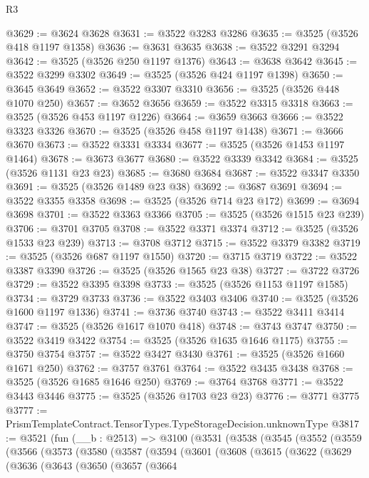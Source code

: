 \begin{lexlean}{R3}
\begin{coremodule}
@3629 := @3624 @3628
@3631 := @3522 @3283 @3286
@3635 := @3525 (@3526 @418 @1197 @1358)
@3636 := @3631 @3635
@3638 := @3522 @3291 @3294
@3642 := @3525 (@3526 @250 @1197 @1376)
@3643 := @3638 @3642
@3645 := @3522 @3299 @3302
@3649 := @3525 (@3526 @424 @1197 @1398)
@3650 := @3645 @3649
@3652 := @3522 @3307 @3310
@3656 := @3525 (@3526 @448 @1070 @250)
@3657 := @3652 @3656
@3659 := @3522 @3315 @3318
@3663 := @3525 (@3526 @453 @1197 @1226)
@3664 := @3659 @3663
@3666 := @3522 @3323 @3326
@3670 := @3525 (@3526 @458 @1197 @1438)
@3671 := @3666 @3670
@3673 := @3522 @3331 @3334
@3677 := @3525 (@3526 @1453 @1197 @1464)
@3678 := @3673 @3677
@3680 := @3522 @3339 @3342
@3684 := @3525 (@3526 @1131 @23 @23)
@3685 := @3680 @3684
@3687 := @3522 @3347 @3350
@3691 := @3525 (@3526 @1489 @23 @38)
@3692 := @3687 @3691
@3694 := @3522 @3355 @3358
@3698 := @3525 (@3526 @714 @23 @172)
@3699 := @3694 @3698
@3701 := @3522 @3363 @3366
@3705 := @3525 (@3526 @1515 @23 @239)
@3706 := @3701 @3705
@3708 := @3522 @3371 @3374
@3712 := @3525 (@3526 @1533 @23 @239)
@3713 := @3708 @3712
@3715 := @3522 @3379 @3382
@3719 := @3525 (@3526 @687 @1197 @1550)
@3720 := @3715 @3719
@3722 := @3522 @3387 @3390
@3726 := @3525 (@3526 @1565 @23 @38)
@3727 := @3722 @3726
@3729 := @3522 @3395 @3398
@3733 := @3525 (@3526 @1153 @1197 @1585)
@3734 := @3729 @3733
@3736 := @3522 @3403 @3406
@3740 := @3525 (@3526 @1600 @1197 @1336)
@3741 := @3736 @3740
@3743 := @3522 @3411 @3414
@3747 := @3525 (@3526 @1617 @1070 @418)
@3748 := @3743 @3747
@3750 := @3522 @3419 @3422
@3754 := @3525 (@3526 @1635 @1646 @1175)
@3755 := @3750 @3754
@3757 := @3522 @3427 @3430
@3761 := @3525 (@3526 @1660 @1671 @250)
@3762 := @3757 @3761
@3764 := @3522 @3435 @3438
@3768 := @3525 (@3526 @1685 @1646 @250)
@3769 := @3764 @3768
@3771 := @3522 @3443 @3446
@3775 := @3525 (@3526 @1703 @23 @23)
@3776 := @3771 @3775
@3777 := PrismTemplateContract.TensorTypes.TypeStorageDecision.unknownType
@3817 := @3521
    (fun (__b : @2513) =>
    @3100
      (@3531
        (@3538
          (@3545
            (@3552
              (@3559
                (@3566
                  (@3573
                    (@3580
                      (@3587
                        (@3594
                          (@3601
                            (@3608
                              (@3615
                                (@3622
                                  (@3629
                                    (@3636
                                      (@3643
                                        (@3650
                                          (@3657
                                            (@3664

\end{coremodule}
\end{lexlean}
